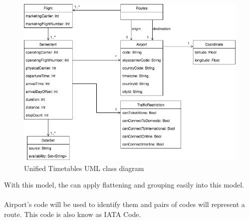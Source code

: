 \begin{figure}[H]
\centering
\includegraphics[scale=0.6]{diagrams/unified_model.png}
\caption{Unified Timetables UML class diagram}
\end{figure}

With this model, the  can apply flattening and grouping easily into this model.
\\\\
Airport's code will be used to identify them and pairs of codes will represent a route. This code is also know as IATA Code\cite{iata_code}.








